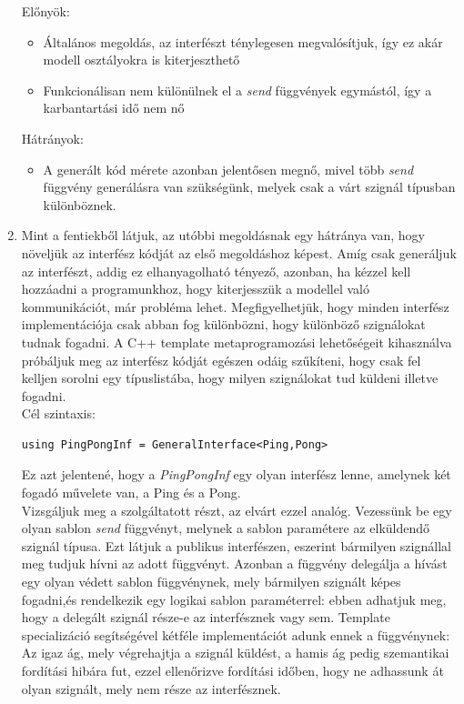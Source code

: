\documentclass[a4paper,12pt]{report}
\begin{document}
\begin{enumerate}
Előnyök:
\begin{itemize}
\item Általános megoldás, az interfészt ténylegesen megvalósítjuk, így ez akár modell osztályokra is kiterjeszthető
\item Funkcionálisan nem különülnek el a \textit{send} függvények egymástól, így a karbantartási idő nem nő
\end{itemize}
Hátrányok:
\begin{itemize}
\item A generált kód mérete azonban jelentősen megnő, mivel több \textit{send} függvény generálásra van szükségünk, melyek csak a várt szignál típusban különböznek.
\end{itemize}
\item Mint a fentiekből látjuk, az utóbbi megoldásnak egy hátránya van, hogy növeljük az interfész kódját az első megoldáshoz képest. Amíg csak generáljuk az interfészt, addig ez elhanyagolható tényező, azonban, ha kézzel kell hozzáadni a programunkhoz, hogy kiterjesszük a modellel való kommunikációt, már probléma lehet. Megfigyelhetjük, hogy minden interfész implementációja csak abban fog különbözni, hogy különböző szignálokat tudnak fogadni. A C++ template metaprogramozási lehetőségeit kihasználva próbáljuk meg az interfész kódját egészen odáig szűkíteni, hogy csak fel kelljen sorolni egy típuslistába, hogy milyen szignálokat tud küldeni illetve fogadni. \\
Cél szintaxis: 
\begin{lstlisting}
using PingPongInf = GeneralInterface<Ping,Pong>
\end{lstlisting}
Ez azt jelentené, hogy a \textit{PingPongInf} egy olyan interfész lenne, amelynek két fogadó művelete van, a Ping és a Pong.\\
Vizsgáljuk meg a szolgáltatott részt, az elvárt ezzel analóg. Vezessünk be egy olyan sablon \textit{send} függvényt, melynek a sablon paramétere az elküldendő szignál típusa. Ezt látjuk a publikus interfészen, eszerint bármilyen szignállal meg tudjuk hívni az adott függvényt. Azonban a függvény delegálja a hívást egy olyan védett sablon függvénynek, mely bármilyen szignált képes fogadni,és rendelkezik egy logikai sablon paraméterrel: ebben adhatjuk meg, hogy a delegált szignál része-e az interfésznek vagy sem. 
Template specializáció segítségével kétféle implementációt adunk ennek a függvénynek: Az igaz ág, mely végrehajtja a szignál küldést, a hamis ág pedig szemantikai fordítási hibára fut, ezzel ellenőrizve fordítási időben, hogy ne adhassunk át olyan szignált, mely nem része az interfésznek. \\

\end{enumerate}
\end{document}
